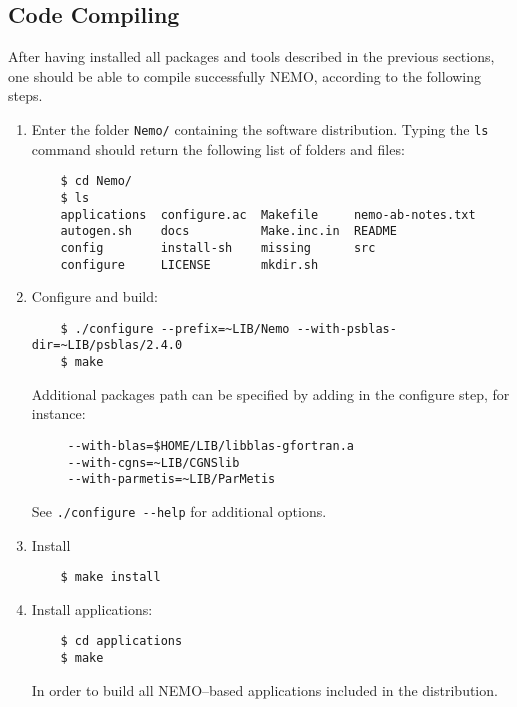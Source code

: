 \documentclass[a4paper,12pt]{article}%
\begin{document}
\subsection{Code Compiling}

After having installed all packages and tools described in the
previous sections, one should be able to compile successfully NEMO,
according to the following steps.

\begin{enumerate}
\item Enter the folder \verb+Nemo/+ containing the software
  distribution. Typing the \verb+ls+ command should return the
  following list of folders and files:
  \begin{Verbatim}
    $ cd Nemo/
    $ ls
    applications  configure.ac  Makefile     nemo-ab-notes.txt
    autogen.sh    docs          Make.inc.in  README
    config        install-sh    missing      src
    configure     LICENSE       mkdir.sh

  \end{Verbatim}
\item Configure and build:
  \begin{Verbatim}
    $ ./configure --prefix=~LIB/Nemo --with-psblas-dir=~LIB/psblas/2.4.0
    $ make
  \end{Verbatim}
Additional packages path can be specified by adding in the configure step, for
instance:
\begin{Verbatim}
     --with-blas=$HOME/LIB/libblas-gfortran.a
     --with-cgns=~LIB/CGNSlib
     --with-parmetis=~LIB/ParMetis
\end{Verbatim}
See \verb+./configure --help+ for additional options.
\item Install
  \begin{Verbatim}
    $ make install
  \end{Verbatim}
\item Install applications:
  \begin{Verbatim}
    $ cd applications
    $ make
  \end{Verbatim}
In order to build all NEMO--based applications included in the
  distribution.
\end{enumerate}
\end{document}
